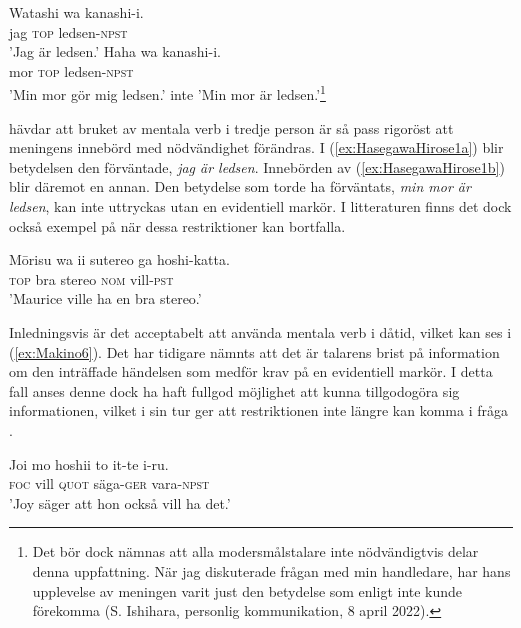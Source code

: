 \documentclass[12pt,a4paper]{article}
\begin{document}
\begin{exe}
\ex
\begin{xlist}
\ex
\label{ex:HasegawaHirose1a}
\gll Watashi wa kanashi-i. \\
     jag \textsc{top} ledsen-\textsc{npst} \\
\glt 'Jag är ledsen.'
\ex
\label{ex:HasegawaHirose1b}
\gll Haha wa kanashi-i. \\
     mor \textsc{top} ledsen-\textsc{npst} \\
\glt 'Min mor gör mig ledsen.' inte 'Min mor är ledsen.'\footnote{Det bör dock nämnas att alla modersmålstalare inte nödvändigtvis delar denna uppfattning. När jag diskuterade frågan med min handledare, har hans upplevelse av meningen varit just den betydelse som enligt \textcite{hasegawa2005} inte kunde förekomma (S. Ishihara, personlig kommunikation, 8 april 2022).}
\flushright \autocite[229]{hasegawa2005}
\end{xlist}
\end{exe}

\noindent
\textcite{hasegawa2005} hävdar att bruket av mentala verb i tredje person är så pass rigoröst att meningens innebörd med nödvändighet förändras. I  (\ref{ex:HasegawaHirose1a}) blir betydelsen den förväntade, \emph{jag är ledsen}. Innebörden av (\ref{ex:HasegawaHirose1b}) blir däremot en annan. Den betydelse som torde ha förväntats, \emph{min mor är ledsen}, kan inte uttryckas utan en evidentiell markör. I litteraturen finns det dock också exempel på när dessa restriktioner kan bortfalla.

\begin{exe}
\ex
\label{ex:Makino6}
\gll M\=orisu wa ii sutereo ga hoshi-katta. \\
     {} \textsc{top} bra stereo \textsc{nom} vill-\textsc{pst} \\
\glt 'Maurice ville ha en bra stereo.'
\hfill \autocite[anpassat från][145]{makino1986}
\end{exe}

\noindent
Inledningsvis är det acceptabelt att använda mentala verb i dåtid, vilket kan ses i (\ref{ex:Makino6}). Det har tidigare nämnts att det är talarens brist på information om den inträffade händelsen som medför krav på en evidentiell markör. I detta fall anses denne dock ha haft fullgod möjlighet att kunna tillgodogöra sig informationen, vilket i sin tur ger att restriktionen inte längre kan komma i fråga \autocite{makino1986,shibatani1990}.

\begin{exe}
\ex
\label{ex:Makino7}
\gll Joi mo hoshii to it-te i-ru. \\
     {} \textsc{foc} vill \textsc{quot} säga-\textsc{ger} vara-\textsc{npst} \\
\glt 'Joy säger att hon också vill ha det.'
\hfill \autocite[anpassat från][145]{makino1986}
\end{exe}
\end{document}
